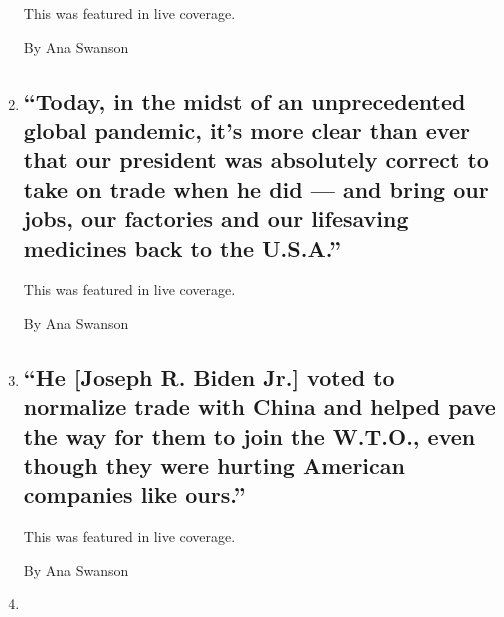 \begin{enumerate}
  This was featured in live coverage.

  By Ana Swanson
\item
  \href{/live/2020/08/27/us/rnc-fact-check/today-in-the-midst-of-an-unprecedented-global-pandemic-its-more-clear-than-ever-that-our-president-was-absolutely-correct-to-tak}{}

  \hypertarget{today-in-the-midst-of-an-unprecedented-global-pandemic-its-more-clear-than-ever-that-our-president-was-absolutely-correct-to-take-on-trade-when-he-did--and-bring-our-jobs-our-factories-and-our-lifesaving-medicines-back-to-the-usa}{%
  \subsection{``Today, in the midst of an unprecedented global pandemic,
  it's more clear than ever that our president was absolutely correct to
  take on trade when he did --- and bring our jobs, our factories and
  our lifesaving medicines back to the
  U.S.A.''}\label{today-in-the-midst-of-an-unprecedented-global-pandemic-its-more-clear-than-ever-that-our-president-was-absolutely-correct-to-take-on-trade-when-he-did--and-bring-our-jobs-our-factories-and-our-lifesaving-medicines-back-to-the-usa}}

  This was featured in live coverage.

  By Ana Swanson
\item
  \href{/live/2020/08/27/us/rnc-fact-check/he-joseph-r-biden-jr-voted-to-normalize-trade-with-china-and-helped-pave-the-way-for-them-to-join-the-wto-even-though-they-were-}{}

  \hypertarget{he-joseph-r-biden-jr-voted-to-normalize-trade-with-china-and-helped-pave-the-way-for-them-to-join-the-wto-even-though-they-were-hurting-american-companies-like-ours}{%
  \subsection{``He {[}Joseph R. Biden Jr.{]} voted to normalize trade
  with China and helped pave the way for them to join the W.T.O., even
  though they were hurting American companies like
  ours.''}\label{he-joseph-r-biden-jr-voted-to-normalize-trade-with-china-and-helped-pave-the-way-for-them-to-join-the-wto-even-though-they-were-hurting-american-companies-like-ours}}

  This was featured in live coverage.

  By Ana Swanson
\item
  \href{/live/2020/08/26/us/rnc-fact-check/joe-biden-has-been-a-cheerleader-for-communist-china-he-wants-to-repeal-all-the-tariffs-that-are-leveling-the-playing-field-for-}{}


\end{enumerate}
